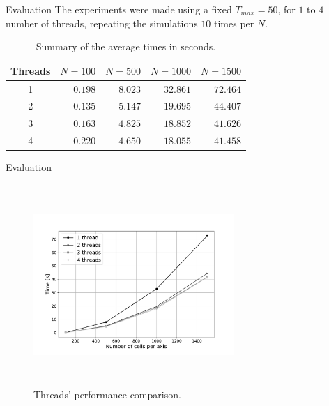 \documentclass{beamer}
\begin{document}
      \begin{frame}{Evaluation}
        The experiments were made using a fixed $T_{max}=50$, for $1$ to $4$ number of threads, repeating the 
        simulations $10$ times per $N$.
        \begin{table}[!ht]
          \renewcommand{\arraystretch}{1.3}
          \centering
          \caption{Summary of the average times in seconds.}
          \label{tab:results}
          \begin{tabular}{c||rrrr}
            \hline
            Threads & $N=100$ & $N=500$ & $N=1000$ & $N=1500$ \\ \hline\hline
            1       & $0.198$   & $8.023$   & $32.861$   & $72.464$   \\
            2       & $0.135$   & $5.147$   & $19.695$   & $44.407$   \\
            3       & $0.163$   & $4.825$   & $18.852$   & $41.626$   \\
            4       & $0.220$   & $4.650$   & $18.055$   & $41.458$  
          \end{tabular}
        \end{table}
      \end{frame}
      
      \begin{frame}{Evaluation}
        \begin{figure}[!ht]
          \centering
          \includegraphics[width=3in,height=3in,clip,keepaspectratio]{figures/benchmark.pdf}
          \caption{Threads' performance comparison.}
          \label{fig:benchmark}
        \end{figure}
      \end{frame}
      
\end{document}
